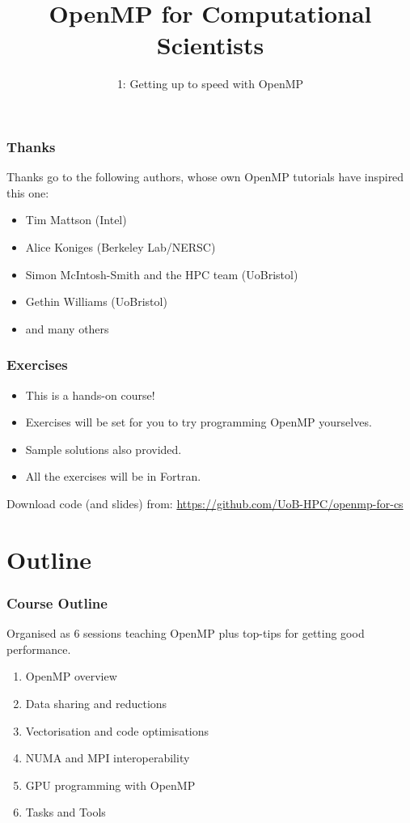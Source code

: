 \documentclass{beamer}
\title{OpenMP for Computational Scientists}
\subtitle{1: Getting up to speed with OpenMP}
\begin{document}
\frame{\titlepage}

\begin{frame}
\frametitle{Thanks}
Thanks go to the following authors, whose own OpenMP tutorials have inspired this one:
\begin{itemize}
  \item Tim Mattson (Intel)
  \item Alice Koniges (Berkeley Lab/NERSC)
  \item Simon McIntosh-Smith and the HPC team (UoBristol)
  \item Gethin Williams (UoBristol)
  \item and many others
\end{itemize}
\end{frame}

\begin{frame}
\frametitle{Exercises}
\begin{itemize}
\item This is a hands-on course!
\item Exercises will be set for you to try programming OpenMP yourselves.
\item Sample solutions also provided.
\item All the exercises will be in Fortran.
\end{itemize}

Download code (and slides) from:
\url{https://github.com/UoB-HPC/openmp-for-cs}
\end{frame}

\section{Outline}
\begin{frame}
\frametitle{Course Outline}
Organised as 6 sessions teaching OpenMP plus top-tips for getting good performance.
\begin{enumerate}
  \item OpenMP overview
  \item Data sharing and reductions
  \item Vectorisation and code optimisations
  \item NUMA and MPI interoperability
  \item GPU programming with OpenMP
  \item Tasks and Tools
\end{enumerate}
\end{frame}
\end{document}
